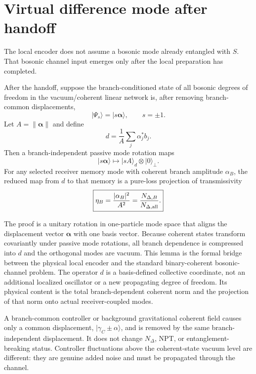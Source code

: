 \section{Virtual difference mode after handoff}
\label{sec:virtualmode}

The local encoder does not assume a bosonic mode already entangled with $S$. That bosonic channel input emerges only after the local preparation has completed.

\begin{lemma}
After the handoff, suppose the branch-conditioned state of all bosonic degrees of freedom in the vacuum/coherent linear network is, after removing branch-common displacements,
\begin{equation}
|\Psi_s\rangle=|s\bm{\alpha}\rangle,
\qquad s=\pm1.
\end{equation}
Let $A=\|\bm{\alpha}\|$ and define
\begin{equation}
\boxed{
d=\frac{1}{A}\sum_j\alpha_j^*b_j.}
\label{eq:virtualmode}
\end{equation}
Then a branch-independent passive mode rotation maps
\begin{equation}
|s\bm{\alpha}\rangle
\longmapsto
|sA\rangle_d\otimes|0\rangle_\perp.
\label{eq:modecompression}
\end{equation}
For any selected receiver memory mode with coherent branch amplitude $\alpha_B$, the reduced map from $d$ to that memory is a pure-loss projection of transmissivity
\begin{equation}
\boxed{
\eta_B=\frac{|\alpha_B|^2}{A^2}
=\frac{N_{\Delta,B}}{N_{\Delta,{\rm all}}}.}
\label{eq:etaB}
\end{equation}
\end{lemma}

The proof is a unitary rotation in one-particle mode space that aligns the displacement vector $\bm{\alpha}$ with one basis vector. Because coherent states transform covariantly under passive mode rotations, all branch dependence is compressed into $d$ and the orthogonal modes are vacuum. This lemma is the formal bridge between the physical local encoder and the standard binary-coherent bosonic-channel problem. The operator $d$ is a basis-defined collective coordinate, not an additional localized oscillator or a new propagating degree of freedom. Its physical content is the total branch-dependent coherent norm and the projection of that norm onto actual receiver-coupled modes.

A branch-common controller or background gravitational coherent field causes only a common displacement, $|\gamma_C\pm\alpha\rangle$, and is removed by the same branch-independent displacement. It does not change $N_\Delta$, NPT, or entanglement-breaking status. Controller fluctuations above the coherent-state vacuum level are different: they are genuine added noise and must be propagated through the channel.

